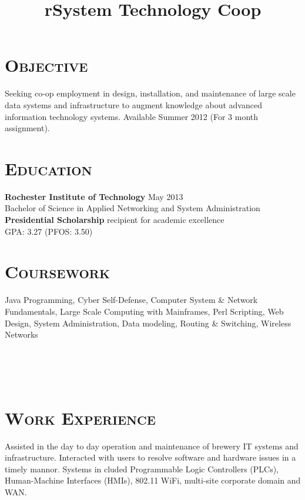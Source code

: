 \begin{resume}


\section{\textsc{Objective}}
Seeking co-op employment in design, installation, and maintenance of large scale data systems and infrastructure to augment knowledge about advanced information technology systems. Available Summer 2012 (For 3 month assignment).
\section{\textsc{Education}}

\textbf{Rochester Institute of Technology} \hfill May 2013 \\
Bachelor of Science in Applied Networking and System Administration \\
{\bf Presidential Scholarship} recipient for academic excellence \\
GPA: 3.27 (PFOS: 3.50)

\section{\textsc{Coursework}}

Java Programming, Cyber Self-Defense, Computer System \& Network Fundamentals, Large Scale Computing with Mainframes, Perl Scripting, Web Design, System Administration, Data modeling, Routing \& Switching, Wireless Networks

\begin{formatb}
  \title{r}\\
  \\
  \body\\
\end{formatb}

\section{\textsc{Work Experience}}

\title{System Technology Coop}
\begin{position}
Assisted in the day to day operation and maintenance of brewery IT systems and infrastructure. Interacted with users to resolve software and hardware issues in a timely mannor. Systems in cluded Programmable Logic Controllers (PLCs), Human-Machine Interfaces (HMIs), 802.11 WiFi, multi-site corporate domain and WAN.
\end{position}


\end{resume}
